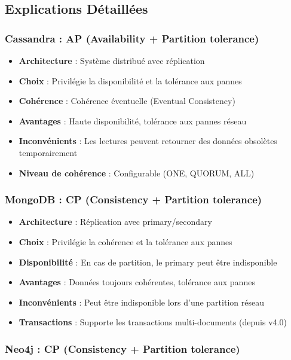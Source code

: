 \documentclass[11pt,a4paper]{article}
\begin{document}
\subsection{Explications Détaillées}

\subsubsection{Cassandra : AP (Availability + Partition tolerance)}

\begin{itemize}
    \item \textbf{Architecture} : Système distribué avec réplication
    \item \textbf{Choix} : Privilégie la disponibilité et la tolérance aux pannes
    \item \textbf{Cohérence} : Cohérence éventuelle (Eventual Consistency)
    \item \textbf{Avantages} : Haute disponibilité, tolérance aux pannes réseau
    \item \textbf{Inconvénients} : Les lectures peuvent retourner des données obsolètes temporairement
    \item \textbf{Niveau de cohérence} : Configurable (ONE, QUORUM, ALL)
\end{itemize}

\subsubsection{MongoDB : CP (Consistency + Partition tolerance)}

\begin{itemize}
    \item \textbf{Architecture} : Réplication avec primary/secondary
    \item \textbf{Choix} : Privilégie la cohérence et la tolérance aux pannes
    \item \textbf{Disponibilité} : En cas de partition, le primary peut être indisponible
    \item \textbf{Avantages} : Données toujours cohérentes, tolérance aux pannes
    \item \textbf{Inconvénients} : Peut être indisponible lors d'une partition réseau
    \item \textbf{Transactions} : Supporte les transactions multi-documents (depuis v4.0)
\end{itemize}

\subsubsection{Neo4j : CP (Consistency + Partition tolerance)}
\end{document}
